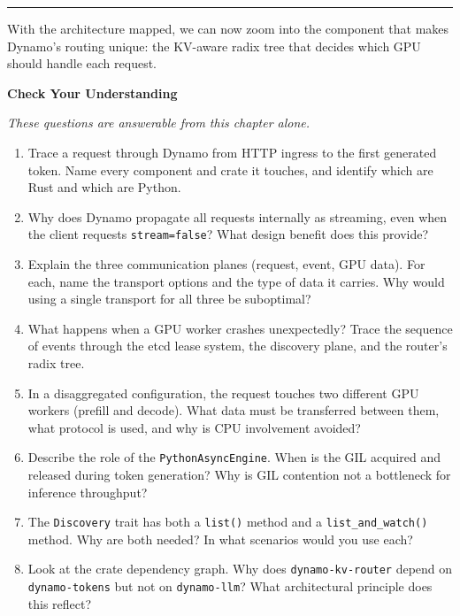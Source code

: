 \medskip
\begin{center}\rule{0.5\linewidth}{0.4pt}\end{center}
\medskip

With the architecture mapped, we can now zoom into the component that makes Dynamo's routing unique: the KV-aware radix tree that decides which GPU should handle each request.

\medskip
\noindent\textbf{Check Your Understanding}

\smallskip
\noindent\emph{These questions are answerable from this chapter alone.}

\begin{enumerate}
  \item Trace a request through Dynamo from HTTP ingress to the first generated token. Name every component and crate it touches, and identify which are Rust and which are Python.

  \item Why does Dynamo propagate all requests internally as streaming, even when the client requests \texttt{stream=false}? What design benefit does this provide?

  \item Explain the three communication planes (request, event, GPU data). For each, name the transport options and the type of data it carries. Why would using a single transport for all three be suboptimal?

  \item What happens when a GPU worker crashes unexpectedly? Trace the sequence of events through the etcd lease system, the discovery plane, and the router's radix tree.

  \item In a disaggregated configuration, the request touches two different GPU workers (prefill and decode). What data must be transferred between them, what protocol is used, and why is CPU involvement avoided?

  \item Describe the role of the \texttt{PythonAsyncEngine}. When is the GIL acquired and released during token generation? Why is GIL contention not a bottleneck for inference throughput?

  \item The \texttt{Discovery} trait has both a \texttt{list()} method and a \texttt{list\_and\_watch()} method. Why are both needed? In what scenarios would you use each?

  \item Look at the crate dependency graph. Why does \texttt{dynamo-kv-router} depend on \texttt{dynamo-tokens} but not on \texttt{dynamo-llm}? What architectural principle does this reflect?
\end{enumerate}


